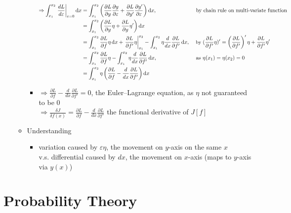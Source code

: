 \begin{itemize}
\begin{itemize}
\begin{itemize}
		\begin{align*}\small \displaystyle \Rightarrow \int_{x_1}^{x_2} \left.\frac{dL}{d\varepsilon}\right|_{\varepsilon=0} \mathop{}\!\mathrm{d} x &= \int_{x_1}^{x_2}\left( \frac{\partial L}{\partial y}\frac{\partial y}{\partial \varepsilon} + \frac{\partial L}{\partial y'}\frac{\partial y'}{\partial \varepsilon} \right) \mathop{}\!\mathrm{d} x, && \text{ by chain rule on multi-variate function} \\
		&= \int_{x_1}^{x_2}\left( \frac{\partial L}{\partial y}\eta + \frac{\partial L}{\partial y}\eta' \right) \mathop{}\!\mathrm{d} x \\
		&= \int_{x_1}^{x_2} \frac{\partial L}{\partial f}\eta \mathop{}\!\mathrm{d} x + \left.\frac{\partial L}{\partial f'}\eta\right|_{x_1}^{x_2} - \int_{x_1}^{x_2}\eta \frac{d}{dx} \frac{\partial L}{\partial f'} \mathop{}\!\mathrm{d} x, && {\small \text{ by } (\frac{\partial L}{\partial f'}\eta)' = \left(\frac{\partial L}{\partial f'}\right)'\eta + \frac{\partial L}{\partial f'}\eta'} \\
		&= \int_{x_1}^{x_2} \frac{\partial L}{\partial f}\eta - \int_{x_1}^{x_2}\eta \frac{d}{dx} \frac{\partial L}{\partial f'} \mathop{}\!\mathrm{d} x, && \text{ as } \eta(x_1)=\eta(x_2)=0 \\
		&= \int_{x_1}^{x_2} \eta \left( \frac{\partial L}{\partial f} - \frac{d}{dx} \frac{\partial L}{\partial f'} \right) \mathop{}\!\mathrm{d} x \end{align*}
		\item $\displaystyle \Rightarrow \frac{\partial L}{\partial f} - \frac{d}{dx}\frac{\partial L}{\partial f'} = 0$, the Euler–Lagrange equation, as $\eta$ not guaranteed to be $0$ \\
		$\displaystyle \Rightarrow \frac{\delta J}{\delta f(x)} = \frac{\partial L}{\partial f} - \frac{d}{dx}\frac{\partial L}{\partial f'}$ the functional derivative of $J[f]$
		\end{itemize}
	\item Understanding
		\begin{itemize}
		\item variation caused by $\varepsilon\eta$, the movement on $y$-axis on the same $x$ \\
		v.s. differential caused by $dx$, the movement on $x$-axis (maps to $y$-axis via $y(x)$)
		\end{itemize}
	\end{itemize}
\end{itemize}

\section{Probability Theory}

